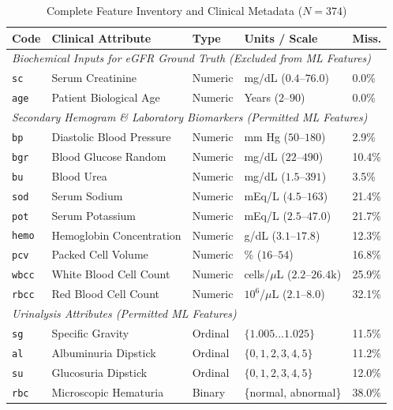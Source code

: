 \documentclass[conference]{IEEEtran}
\begin{document}
\begin{table}[htbp]
\centering
\caption{Complete Feature Inventory and Clinical Metadata ($N = 374$)}
\label{tab:feature_inventory}
\renewcommand{\arraystretch}{0.96}
\scriptsize
\begin{tabularx}{\columnwidth}{lXlll}
\toprule
\textbf{Code} & \textbf{Clinical Attribute} & \textbf{Type} & \textbf{Units / Scale} & \textbf{Miss.} \\
\midrule
\multicolumn{5}{l}{\textit{Biochemical Inputs for eGFR Ground Truth (Excluded from ML Features)}} \\
\texttt{sc} & Serum Creatinine & Numeric & mg/dL ($0.4$--$76.0$) & 0.0\% \\
\texttt{age} & Patient Biological Age & Numeric & Years ($2$--$90$) & 0.0\% \\
\midrule
\multicolumn{5}{l}{\textit{Secondary Hemogram \& Laboratory Biomarkers (Permitted ML Features)}} \\
\texttt{bp} & Diastolic Blood Pressure & Numeric & mm Hg ($50$--$180$) & 2.9\% \\
\texttt{bgr} & Blood Glucose Random & Numeric & mg/dL ($22$--$490$) & 10.4\% \\
\texttt{bu} & Blood Urea & Numeric & mg/dL ($1.5$--$391$) & 3.5\% \\
\texttt{sod} & Serum Sodium & Numeric & mEq/L ($4.5$--$163$) & 21.4\% \\
\texttt{pot} & Serum Potassium & Numeric & mEq/L ($2.5$--$47.0$) & 21.7\% \\
\texttt{hemo} & Hemoglobin Concentration & Numeric & g/dL ($3.1$--$17.8$) & 12.3\% \\
\texttt{pcv} & Packed Cell Volume & Numeric & \% ($16$--$54$) & 16.8\% \\
\texttt{wbcc} & White Blood Cell Count & Numeric & cells/$\mu$L ($2.2$--$26.4\text{k}$) & 25.9\% \\
\texttt{rbcc} & Red Blood Cell Count & Numeric & $10^6$/$\mu$L ($2.1$--$8.0$) & 32.1\% \\
\midrule
\multicolumn{5}{l}{\textit{Urinalysis Attributes (Permitted ML Features)}} \\
\texttt{sg} & Specific Gravity & Ordinal & $\{1.005 \dots 1.025\}$ & 11.5\% \\
\texttt{al} & Albuminuria Dipstick & Ordinal & $\{0, 1, 2, 3, 4, 5\}$ & 11.2\% \\
\texttt{su} & Glucosuria Dipstick & Ordinal & $\{0, 1, 2, 3, 4, 5\}$ & 12.0\% \\
\texttt{rbc} & Microscopic Hematuria & Binary & \{normal, abnormal\} & 38.0\% \\

\end{tabularx}
\end{table}
\end{document}
